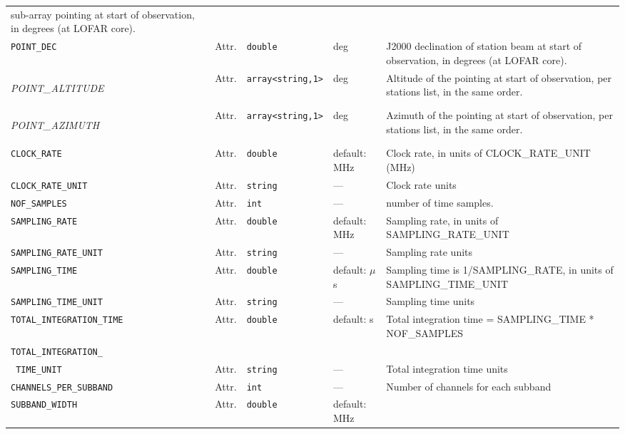 \documentclass[a4paper,10pt,bibtotoc]{scrartcl}
\begin{document}
\begin{supertabular}{|llllp{5cm}|}
    sub-array pointing at start of observation, in degrees (at LOFAR core).\\
  \small{\verb|POINT_DEC|} & Attr. & \verb|double| & deg & J2000 declination of station
    beam at start of observation, in degrees (at LOFAR core).\\
  \begin{scriptsize}\textit{POINT\_ALTITUDE}\end{scriptsize} & Attr. & \verb|array<string,1>| & deg & Altitude 
    of the pointing
    at start of observation, per stations list, in the same order. \\
  \begin{scriptsize}\textit{POINT\_AZIMUTH}\end{scriptsize} & Attr. & \verb|array<string,1>| & deg & Azimuth 
  	of the pointing
    at start of observation, per stations list, in the same order. \\
  \small{\verb|CLOCK_RATE|}   & Attr.   & \verb|double|& default: MHz & Clock rate, in units of CLOCK\_RATE\_UNIT (MHz) \\
  \small{\verb|CLOCK_RATE_UNIT|}  & Attr.   & \verb|string| & --- & Clock rate units \\
  \small{\verb|NOF_SAMPLES|} & Attr. & \verb|int| & --- & number of time samples. \\
  \small{\verb|SAMPLING_RATE|}   & Attr.  & \verb|double|  & default: MHz & Sampling rate, in units of SAMPLING\_RATE\_UNIT \\
  \small{\verb|SAMPLING_RATE_UNIT|}  & Attr.  & \verb|string| & --- & Sampling rate
    units \\
  \small{\verb|SAMPLING_TIME|}  & Attr.  & \verb|double|  & default: $\mu$s & Sampling time is
    1/SAMPLING\_RATE, in units of SAMPLING\_TIME\_UNIT \\
  \small{\verb|SAMPLING_TIME_UNIT|}  & Attr.  & \verb|string| & --- & Sampling time
    units \\
  \small{\verb|TOTAL_INTEGRATION_TIME|}  & Attr.  & \verb|double| & default: s & Total
    integration time = SAMPLING\_TIME * NOF\_SAMPLES \\
  \small{\verb|TOTAL_INTEGRATION_|} &  &  & & \\
  \small{\verb| TIME_UNIT|}  & Attr.  & \verb|string| &--- & Total
    integration time units \\
  \small{\verb|CHANNELS_PER_SUBBAND|}  & Attr. & \verb|int|& --- & Number of
    channels for each subband \\
  \small{\verb|SUBBAND_WIDTH|}   & Attr.  & \verb|double|  &  default: MHz &

\end{supertabular}
\end{document}
